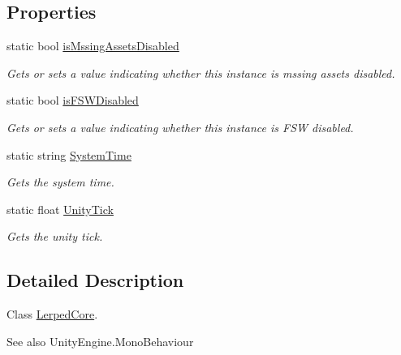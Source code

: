 \subsection*{Properties}
\begin{DoxyCompactItemize}
\item 
static bool \hyperlink{class_lerp2_a_p_i_1_1_lerped_core_a1f60e0aab76d44a0a847593c652495f7}{is\+Mssing\+Assets\+Disabled}
\begin{DoxyCompactList}\small\item\em Gets or sets a value indicating whether this instance is mssing assets disabled. \end{DoxyCompactList}\item 
static bool \hyperlink{class_lerp2_a_p_i_1_1_lerped_core_ac19447f0ae41263eb23f583e2dd925ff}{is\+F\+S\+W\+Disabled}
\begin{DoxyCompactList}\small\item\em Gets or sets a value indicating whether this instance is F\+SW disabled. \end{DoxyCompactList}\item 
static string \hyperlink{class_lerp2_a_p_i_1_1_lerped_core_aa7ee4068007163ee501483f0e305e653}{System\+Time}
\begin{DoxyCompactList}\small\item\em Gets the system time. \end{DoxyCompactList}\item 
static float \hyperlink{class_lerp2_a_p_i_1_1_lerped_core_ac2243bfd26899fc6f82304198cc1b877}{Unity\+Tick}
\begin{DoxyCompactList}\small\item\em Gets the unity tick. \end{DoxyCompactList}\end{DoxyCompactItemize}


\subsection{Detailed Description}
Class \hyperlink{class_lerp2_a_p_i_1_1_lerped_core}{Lerped\+Core}. 

\begin{DoxySeeAlso}{See also}
Unity\+Engine.\+Mono\+Behaviour


\end{DoxySeeAlso}


